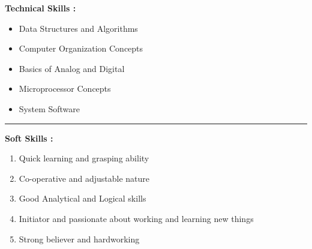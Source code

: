 \documentclass[11pt,a4paper]{article}
\begin{document}
\newpage
\begin{multicols}{3}
	\begin{minipage}{0.15\paperwidth}
		\textbf{Technical\linebreak
		Skills : }
	\end{minipage}
	\begin{minipage}{0.35\paperwidth}
		\begin{flushleft}
		\begin{itemize}
			\item Data Structures and Algorithms
			\item Computer Organization\linebreak
			Concepts
		\end{itemize}
	\end{flushleft}
	\end{minipage}
	\begin{flushright}
	\begin{minipage}{0.35\paperwidth}
		\begin{flushleft}
		\begin{itemize}
			\item Basics of Analog and Digital
			\item Microprocessor Concepts
			\item System Software
		\end{itemize}
		\end{flushleft}
	\end{minipage}
	\end{flushright}
\end{multicols}
\hfill
\hrule
\begin{multicols}{2}
	\begin{minipage}{0.15\paperwidth}
		\textbf{Soft Skills :}
	\end{minipage}
	\begin{minipage}{0.7\paperwidth}
		\begin{enumerate}
			\item Quick learning and grasping ability
			\item Co-operative and adjustable nature
			\item Good Analytical and Logical skills
			\item Initiator and passionate about working and learning new things
			\item Strong believer and hardworking
		\end{enumerate}
	\end{minipage}
\end{multicols}
\hfill
\end{document}
